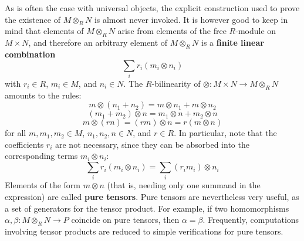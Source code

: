 As is often the case with universal objects, the explicit construction used to prove the existence of $M\otimes_{R}N$ is almost never invoked. It is however good to keep in mind that elements of $M\otimes_{R}N$ arise from elements of the free $R$-module on $M\times N$, and therefore an arbitrary element of $M\otimes_{R}N$ is a \textbf{finite linear combination}
\[\sum_ir_i(m_i\otimes n_i)\]
with $r_i\in R$, $m_i\in M$, and $n_i\in N$. The $R$-bilinearity of $\otimes:M\times N\to M\otimes_{R}N$ amounts to the rules:
\[m\otimes(n_1+n_2)=m\otimes n_1+m\otimes n_2\]
\[(m_1+m_2)\otimes n=m_1\otimes n+m_2\otimes n\]
\[m\otimes(rn)=(rm)\otimes n=r(m\otimes n)\]
for all $m,m_1,m_2\in M$, $n_1,n_2,n\in N$, and $r\in R$. In particular, note that the coefficients $r_i$ are not necessary, since they can be absorbed into the corresponding terms $m_i\otimes n_i$:
\[\sum_ir_i(m_i\otimes n_i)=\sum_i(r_im_i)\otimes n_i\]
Elements of the form $m\otimes n$ (that is, needing only one summand in the expression) are called \textbf{pure tensors}. Pure tensors are nevertheless very useful, as a set of generators for the tensor product. For example, if two homomorphisms $\alpha,\beta:M\otimes_{R}N\to P$ coincide on pure tensors, then $\alpha=\beta$. Frequently, computations involving tensor products are reduced to simple verifications for pure tensors.
